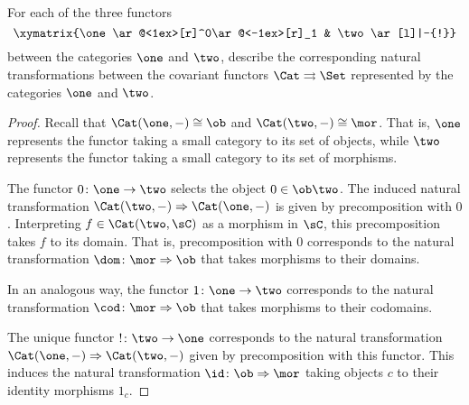 \documentclass[main.tex]{subfiles}
\begin{document}
\paragraph{}
\begin{exercise}
For each of the three functors
\[
\xymatrix{\one\ar@<1ex>[r]^0\ar@<-1ex>[r]_1 & \two\ar[l]|-{!}}
\]
between the categories $\one$ and $\two$, describe the corresponding natural transformations between the covariant functors $\Cat\rightrightarrows\Set$ represented by the categories $\one$ and $\two$.
\end{exercise}

\begin{proof}
Recall that $\Cat(\one,-)\cong\ob$ and $\Cat(\two,-)\cong\mor$. That is, $\one$ represents the functor taking a small category to its set of objects, while $\two$ represents the functor taking a small category to its set of morphisms.

The functor $0\colon\one\rightarrow\two$ selects the object $0\in\ob\two$. The induced natural transformation $\Cat(\two,-)\Rightarrow\Cat(\one,-)$ is given by precomposition with $0$. Interpreting $f\in\Cat(\two,\sC)$ as a morphism in $\sC$, this precomposition takes $f$ to its domain. That is, precomposition with $0$ corresponds to the natural transformation $\dom\colon\mor\Rightarrow\ob$ that takes morphisms to their domains.

In an analogous way, the functor $1\colon\one\rightarrow\two$ corresponds to the natural transformation $\cod\colon\mor\Rightarrow\ob$ that takes morphisms to their codomains. 

The unique functor $!\colon\two\rightarrow\one$ corresponds to the natural transformation $\Cat(\one,-)\Rightarrow\Cat(\two,-)$ given by precomposition with this functor. This induces the natural transformation $\id\colon\ob\Rightarrow\mor$ taking objects $c$ to their identity morphisms $1_c$.

\end{proof}
\end{document}
